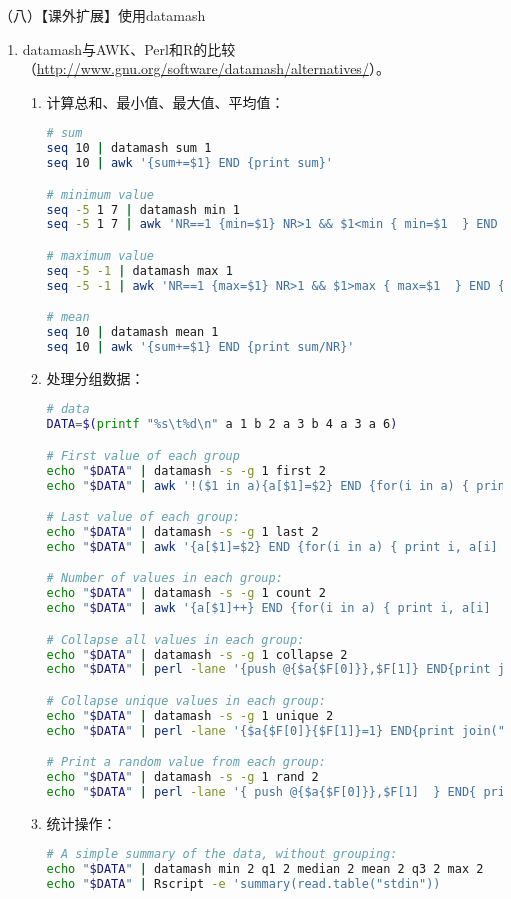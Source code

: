 \vspace{0.1in}
（八）【课外扩展】使用datamash
\begin{enumerate}
  \item datamash与AWK、Perl和R的比较（\href{http://www.gnu.org/software/datamash/alternatives/}{http://www.gnu.org/software/datamash/alternatives/}）。
    \begin{enumerate}
      \item 计算总和、最小值、最大值、平均值：
\begin{lstlisting}[language=bash]
# sum
seq 10 | datamash sum 1
seq 10 | awk '{sum+=$1} END {print sum}'

# minimum value
seq -5 1 7 | datamash min 1
seq -5 1 7 | awk 'NR==1 {min=$1} NR>1 && $1<min { min=$1  } END {print min}'

# maximum value
seq -5 -1 | datamash max 1
seq -5 -1 | awk 'NR==1 {max=$1} NR>1 && $1>max { max=$1  } END {print max}'

# mean
seq 10 | datamash mean 1
seq 10 | awk '{sum+=$1} END {print sum/NR}'
\end{lstlisting}
      \item 处理分组数据：
\begin{lstlisting}[language=bash]
# data
DATA=$(printf "%s\t%d\n" a 1 b 2 a 3 b 4 a 3 a 6)

# First value of each group
echo "$DATA" | datamash -s -g 1 first 2
echo "$DATA" | awk '!($1 in a){a[$1]=$2} END {for(i in a) { print i, a[i] }}'

# Last value of each group:
echo "$DATA" | datamash -s -g 1 last 2
echo "$DATA" | awk '{a[$1]=$2} END {for(i in a) { print i, a[i]  }}'

# Number of values in each group:
echo "$DATA" | datamash -s -g 1 count 2
echo "$DATA" | awk '{a[$1]++} END {for(i in a) { print i, a[i]  }}'

# Collapse all values in each group:
echo "$DATA" | datamash -s -g 1 collapse 2
echo "$DATA" | perl -lane '{push @{$a{$F[0]}},$F[1]} END{print join("\n",map{"$_ ".join(",",@{$a{$_}})} sort keys %a);}'

# Collapse unique values in each group:
echo "$DATA" | datamash -s -g 1 unique 2
echo "$DATA" | perl -lane '{$a{$F[0]}{$F[1]}=1} END{print join("\n",map{"$_ ".join(",",sort keys %{$a{$_}})} sort keys %a);}'

# Print a random value from each group:
echo "$DATA" | datamash -s -g 1 rand 2
echo "$DATA" | perl -lane '{ push @{$a{$F[0]}},$F[1]  } END{ print join("\n",map{"$_ ".$a{$_}->[rand(@{$a{$_}})] } sort keys %a ) ; }'
\end{lstlisting}
      \item 统计操作：
\begin{lstlisting}[language=bash]
# A simple summary of the data, without grouping:
echo "$DATA" | datamash min 2 q1 2 median 2 mean 2 q3 2 max 2
echo "$DATA" | Rscript -e 'summary(read.table("stdin"))


\end{lstlisting}
\end{enumerate}
\end{enumerate}
